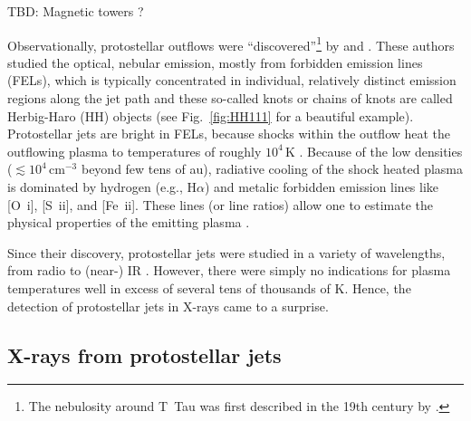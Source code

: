 {\color{red} TBD: Magnetic towers \citep{Huarte_2012}? }

Observationally,  protostellar outflows  were ``discovered''\footnote{The nebulosity around T~Tau was first described in the 19th century  by \citet{Burnham_1890, Burnham_1894}.} by \citet{Herbig_1950,Herbig_1951} and \citet{Haro_1952,Haro_1953}. These authors studied the optical, nebular emission, mostly from forbidden emission lines (FELs), which is typically concentrated in individual, relatively distinct emission regions along the jet path and these so-called knots or chains of knots are called Herbig-Haro (HH) objects (see Fig.~\ref{fig:HH111} for a beautiful example). Protostellar jets are bright in FELs, because shocks within the outflow heat the outflowing plasma to temperatures of roughly $10^4\,$K \citep{}. Because of the low densities ($\lesssim10^4\,$cm$^{-3}$ beyond few tens of au), radiative cooling of the shock heated plasma is dominated by hydrogen (e.g., H$\alpha$) and metalic forbidden emission lines like [O~{\sc i}], [S~{\sc ii}], and [Fe~{\sc ii}]. These lines (or line ratios) allow one to estimate the physical properties of the emitting plasma \citep[temperature, density, ionization degree, e.g., ][]{Bacciotti_1999}.

Since their discovery, protostellar jets were studied in a variety of wavelengths, from radio \citep{} to (near-) IR \citep{}. However, there were simply no indications for plasma temperatures well in excess of several tens of thousands of K. Hence, the detection of protostellar jets in X-rays came to a surprise.

\subsection{X-rays from protostellar jets}

